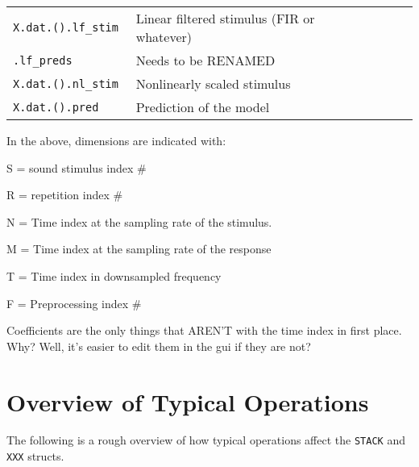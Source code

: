 \documentclass{article}
\newcommand{\matlab}[1]{\texttt{#1}}
\begin{document}
\begin{tabular}{|l|l|l|l|l|}
\matlab{X{}.dat.().lf\_stim        } & Linear filtered stimulus (FIR or whatever)                   &         &                              &   \\
\matlab{.lf\_preds                 } & Needs to be RENAMED                                          &         &                              &   \\
\matlab{X{}.dat.().nl\_stim        } & Nonlinearly scaled stimulus                                  &         &                              &   \\
\matlab{X{}.dat.().pred           } & Prediction of the model &         &                              &   \\
\end{tabular}

In the above, dimensions are indicated with:

\begin{description}
  \item {S} = sound stimulus index \#
  \item {R} = repetition index \#
  \item {N} = Time index at the sampling rate of the stimulus. 
  \item {M} = Time index at the sampling rate of the response
  \item {T} = Time index in downsampled frequency
  \item {F} = Preprocessing index \#
\end{description}


Coefficients are the only things that AREN'T with the time index in first place. Why? Well, it's easier to edit them in the gui if they are not?

\section{Overview of Typical Operations}

The following is a rough overview of how typical operations affect the \matlab{STACK} and \matlab{XXX} structs. 
\end{document}
